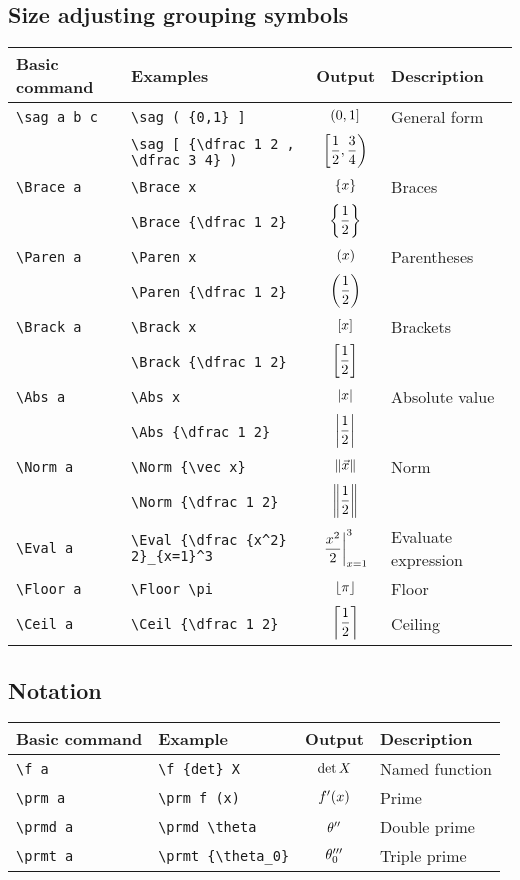 \documentclass{article}
\begin{document}
\renewcommand{\arraystretch}{2.5} 

\subsection*{Size adjusting grouping symbols}
\begin{tabular}{llc l}
Basic command & Examples &  Output & Description\\
\hline
\verb|\sag a b c| & \verb|\sag ( {0,1} ]| & $\left( 0,1 \right]$  & General form\\
& \verb|\sag [ {\dfrac 1 2 , \dfrac 3 4} )| &  $\left[ \dfrac 1 2 , \dfrac 3 4 \right)$\\
\verb|\Brace a| & \verb|\Brace x| & $\left\{ x \right\}$  & Braces\\
& \verb|\Brace {\dfrac 1 2}| &  $\left\{ \dfrac 1 2 \right\}$\\
\verb|\Paren a| & \verb|\Paren x| & $\left( x \right)$  & Parentheses\\
& \verb|\Paren {\dfrac 1 2}| &  $\left( \dfrac 1 2 \right)$\\
\verb|\Brack a| & \verb|\Brack x| & $\left[ x \right]$  & Brackets\\
& \verb|\Brack {\dfrac 1 2}| &  $\left[ \dfrac 1 2 \right]$\\
\verb|\Abs a| & \verb|\Abs x| & $\left\lvert x \right\rvert$  & Absolute value\\
& \verb|\Abs {\dfrac 1 2}| &  $\left\lvert \dfrac 1 2 \right\rvert$\\
\verb|\Norm a| & \verb|\Norm {\vec x}| & $\left\lVert \vec x \right\rVert$  & Norm\\
& \verb|\Norm {\dfrac 1 2}| &  $\left\lVert \dfrac 1 2 \right\rVert$\\
\verb|\Eval a| & \verb|\Eval {\dfrac {x^2} 2}_{x=1}^3| &  $\left. \dfrac {x^2} 2 \right|_{x=1}^3$ & Evaluate expression\\
\verb|\Floor a| & \verb|\Floor \pi| & $\left\lfloor \pi \right\rfloor$  & Floor\\
\verb|\Ceil a| & \verb|\Ceil {\dfrac 1 2}| &  $\left\lceil \dfrac 1 2 \right\rceil$ & Ceiling\\
\end{tabular}

\renewcommand{\arraystretch}{1.5} 

\subsection*{Notation}

\begin{tabular}{llc  l}
Basic command & Example &  Output & Description\\
\hline
\verb|\f a| & \verb|\f {det} X| &  $\mathrm{det} \, X$ & Named function\\
\verb|\prm a| & \verb|\prm f (x)| &  $f^{\prime} (x)$ & Prime\\
\verb|\prmd a| & \verb|\prmd \theta| &  $\theta^{\prime \prime}$ & Double prime\\
\verb|\prmt a| & \verb|\prmt {\theta_0}| &  $\theta_0^{\prime \prime \prime}$ & Triple prime\\
\end{tabular}
\end{document}
